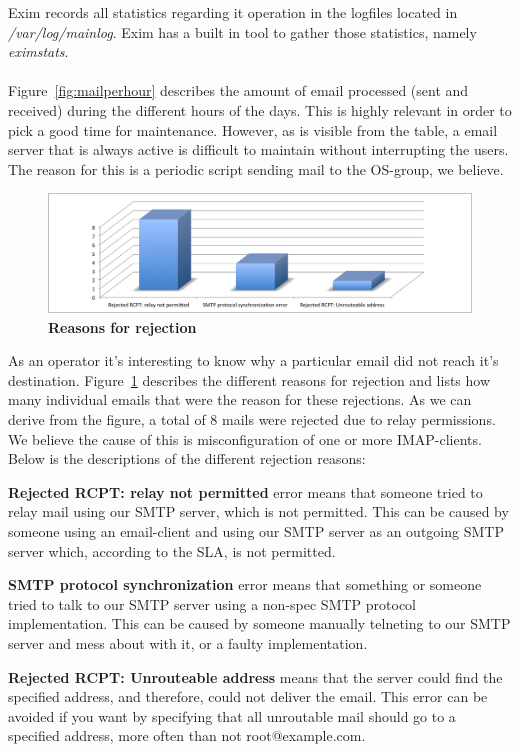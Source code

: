 Exim records all statistics regarding it operation in the logfiles
located in \emph{/var/log/mainlog}. Exim has a built in tool to gather
those statistics, namely \emph{eximstats}.\\\\
Figure~\ref{fig:mailperhour}  describes the amount of email processed (sent
and received) during the different hours of the days. This is highly
relevant in order to pick a good time for maintenance. However, as is
visible from the table, a email server that is always active is
difficult to maintain without interrupting the users. The reason for
this is a periodic script sending mail to the OS-group, we believe.
\begin{figure}[htb]
  \begin{center}
    \includegraphics[scale=0.55]{img/rejection-reasons.png}
  \end{center}
  \caption{\bf{Reasons for rejection}}
  \label{fig:rejection}
\end{figure}
As an operator it's interesting to know why a particular email did not
reach it's destination. Figure~\ref{fig:rejection} describes the
different reasons for rejection and lists how many individual emails
that were the reason for these rejections. As we can derive from the
figure, a total of 8 mails were rejected due to relay permissions. We
believe the cause of this is misconfiguration of one or more
IMAP-clients. Below is the descriptions of the different rejection
reasons:
\begin{description}
\item \textbf{Rejected RCPT: relay not permitted} error means that someone tried to relay mail
using our SMTP server, which is not permitted. This can be caused by someone
using an email-client and using our SMTP server as an outgoing SMTP server
which, according to the SLA, is not permitted.

\item \textbf{SMTP protocol synchronization} error means that something or someone tried to
talk to our SMTP server using a non-spec SMTP protocol implementation. This can
be caused by someone manually telneting to our SMTP server and mess about with
it, or a faulty implementation.

\item \textbf{Rejected RCPT: Unrouteable address} means that the server could find the
specified address, and therefore, could not deliver the email. This error can be
avoided if you want by specifying that all unroutable mail should go to a
specified address, more often than not root@example.com. 

\end{description}
